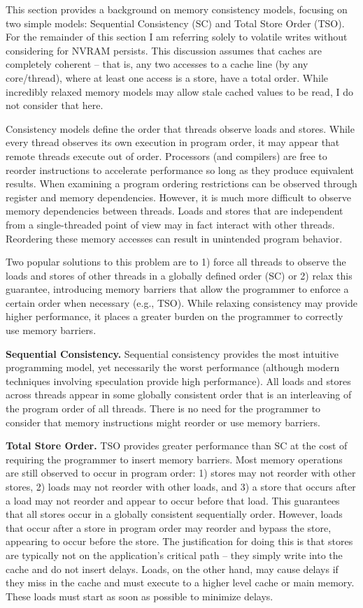 This section provides a background on memory consistency models, focusing on two simple models: Sequential Consistency (SC) and Total Store Order (TSO).
For the remainder of this section I am referring solely to volatile writes without considering for NVRAM persists.
This discussion assumes that caches are completely coherent -- that is, any two accesses to a cache line (by any core/thread), where at least one access is a store, have a total order.
While incredibly relaxed memory models may allow stale cached values to be read, I do not consider that here.

Consistency models define the order that threads observe loads and stores.
While every thread observes its own execution in program order, it may appear that remote threads execute out of order.
Processors (and compilers) are free to reorder instructions to accelerate performance so long as they produce equivalent results.
When examining a program ordering restrictions can be observed through register and memory dependencies.
However, it is much more difficult to observe memory dependencies between threads.
Loads and stores that are independent from a single-threaded point of view may in fact interact with other threads.
Reordering these memory accesses can result in unintended program behavior.

Two popular solutions to this problem are to 1) force all threads to observe the loads and stores of other threads in a globally defined order (SC) or 2) relax this guarantee, introducing memory barriers that allow the programmer to enforce a certain order when necessary (e.g., TSO).
While relaxing consistency may provide higher performance, it places a greater burden on the programmer to correctly use memory barriers.

\textbf{Sequential Consistency.}
Sequential consistency provides the most intuitive programming model, yet necessarily the worst performance (although modern techniques involving speculation provide high performance).
All loads and stores across threads appear in some globally consistent order that is an interleaving of the program order of all threads.
There is no need for the programmer to consider that memory instructions might reorder or use memory barriers.

\textbf{Total Store Order.}
TSO provides greater performance than SC at the cost of requiring the programmer to insert memory barriers.
Most memory operations are still observed to occur in program order: 1) stores may not reorder with other stores, 2) loads may not reorder with other loads, and 3) a store that occurs after a load may not reorder and appear to occur before that load.
This guarantees that all stores occur in a globally consistent sequentially order.
However, loads that occur after a store in program order may reorder and bypass the store, appearing to occur before the store.
The justification for doing this is that stores are typically not on the application's critical path -- they simply write into the cache and do not insert delays.
Loads, on the other hand, may cause delays if they miss in the cache and must execute to a higher level cache or main memory.
These loads must start as soon as possible to minimize delays.

